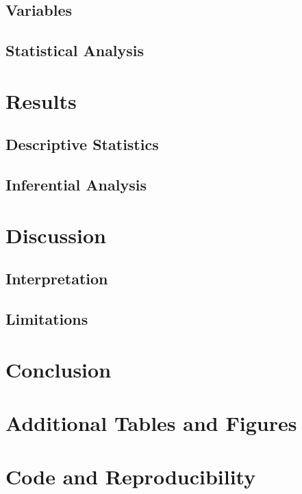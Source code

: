 \documentclass[11pt, a4paper]{article}
\begin{document}
\subsection{Variables}
\subsection{Statistical Analysis}

\section{Results}
\subsection{Descriptive Statistics}
\subsection{Inferential Analysis}

\section{Discussion}
\subsection{Interpretation}
\subsection{Limitations}

\section{Conclusion}

\printbibliography

\appendix
\section{Additional Tables and Figures}
\section{Code and Reproducibility}
\end{document}
